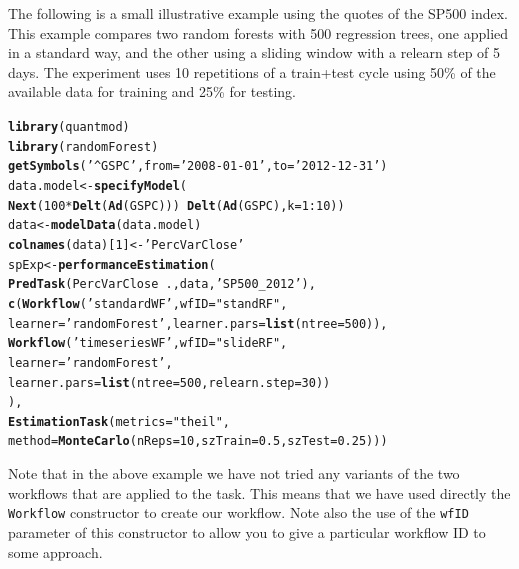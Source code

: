 \documentclass[10pt,a4paper]{article}\usepackage[]{graphicx}\usepackage[]{color}
\makeatletter
\newcommand{\hlnum}[1]{\textcolor[rgb]{0.686,0.059,0.569}{#1}}%
\newcommand{\hlstr}[1]{\textcolor[rgb]{0.192,0.494,0.8}{#1}}%
\newcommand{\hlopt}[1]{\textcolor[rgb]{0,0,0}{#1}}%
\newcommand{\hlstd}[1]{\textcolor[rgb]{0.345,0.345,0.345}{#1}}%
\newcommand{\hlkwb}[1]{\textcolor[rgb]{0.69,0.353,0.396}{#1}}%
\newcommand{\hlkwc}[1]{\textcolor[rgb]{0.333,0.667,0.333}{#1}}%
\newcommand{\hlkwd}[1]{\textcolor[rgb]{0.737,0.353,0.396}{\textbf{#1}}}%
\newenvironment{kframe}{%
 \def\at@end@of@kframe{}%
 \ifinner\ifhmode%
  \def\at@end@of@kframe{\end{minipage}}%
  \begin{minipage}{\columnwidth}%
 \fi\fi%
 \def\FrameCommand##1{\hskip\@totalleftmargin \hskip-\fboxsep
 \colorbox{shadecolor}{##1}\hskip-\fboxsep
     \hskip-\linewidth \hskip-\@totalleftmargin \hskip\columnwidth}%
 \MakeFramed {\advance\hsize-\width
   \@totalleftmargin\z@ \linewidth\hsize
   \@setminipage}}%
 {\par\unskip\endMakeFramed%
 \at@end@of@kframe}
\newenvironment{knitrout}{}{} %
\makeatother
\begin{document}
The following is a small illustrative example using the quotes of the
SP500 index. This example compares two random forests with 500
regression trees, one applied in a standard way, and the other using
a sliding window with a relearn step of 5 days. The experiment
uses 10 repetitions of a train+test cycle using 50\% of the available
data for training and 25\% for testing.

\begin{knitrout}\small
{}\color{fgcolor}\begin{kframe}
\begin{alltt}
\hlkwd{library}\hlstd{(quantmod)}
\hlkwd{library}\hlstd{(randomForest)}
\hlkwd{getSymbols}\hlstd{(}\hlstr{'^GSPC'}\hlstd{,}\hlkwc{from}\hlstd{=}\hlstr{'2008-01-01'}\hlstd{,}\hlkwc{to}\hlstd{=}\hlstr{'2012-12-31'}\hlstd{)}
\hlstd{data.model} \hlkwb{<-} \hlkwd{specifyModel}\hlstd{(}
  \hlkwd{Next}\hlstd{(}\hlnum{100}\hlopt{*}\hlkwd{Delt}\hlstd{(}\hlkwd{Ad}\hlstd{(GSPC)))} \hlopt{~} \hlkwd{Delt}\hlstd{(}\hlkwd{Ad}\hlstd{(GSPC),}\hlkwc{k}\hlstd{=}\hlnum{1}\hlopt{:}\hlnum{10}\hlstd{))}
\hlstd{data} \hlkwb{<-} \hlkwd{modelData}\hlstd{(data.model)}
\hlkwd{colnames}\hlstd{(data)[}\hlnum{1}\hlstd{]} \hlkwb{<-} \hlstr{'PercVarClose'}
\hlstd{spExp} \hlkwb{<-} \hlkwd{performanceEstimation}\hlstd{(}
  \hlkwd{PredTask}\hlstd{(PercVarClose} \hlopt{~} \hlstd{.,data,}\hlstr{'SP500_2012'}\hlstd{),}
  \hlkwd{c}\hlstd{(}\hlkwd{Workflow}\hlstd{(}\hlstr{'standardWF'}\hlstd{,}\hlkwc{wfID}\hlstd{=}\hlstr{"standRF"}\hlstd{,}
             \hlkwc{learner}\hlstd{=}\hlstr{'randomForest'}\hlstd{,}\hlkwc{learner.pars}\hlstd{=}\hlkwd{list}\hlstd{(}\hlkwc{ntree}\hlstd{=}\hlnum{500}\hlstd{)),}
    \hlkwd{Workflow}\hlstd{(}\hlstr{'timeseriesWF'}\hlstd{,}\hlkwc{wfID}\hlstd{=}\hlstr{"slideRF"}\hlstd{,}
             \hlkwc{learner}\hlstd{=}\hlstr{'randomForest'}\hlstd{,}
             \hlkwc{learner.pars}\hlstd{=}\hlkwd{list}\hlstd{(}\hlkwc{ntree}\hlstd{=}\hlnum{500}\hlstd{,}\hlkwc{relearn.step}\hlstd{=}\hlnum{30}\hlstd{))}
   \hlstd{),}
  \hlkwd{EstimationTask}\hlstd{(}\hlkwc{metrics}\hlstd{=}\hlstr{"theil"}\hlstd{,}
                 \hlkwc{method}\hlstd{=}\hlkwd{MonteCarlo}\hlstd{(}\hlkwc{nReps}\hlstd{=}\hlnum{10}\hlstd{,}\hlkwc{szTrain}\hlstd{=}\hlnum{0.5}\hlstd{,}\hlkwc{szTest}\hlstd{=}\hlnum{0.25}\hlstd{)))}
\end{alltt}
\end{kframe}
\end{knitrout}

Note that in the above example we have not tried any variants of the two workflows that are applied to the task. This means that we have used directly the \texttt{Workflow} constructor to create our workflow. Note also the use of the \texttt{wfID} parameter of this constructor to allow you to give a particular workflow ID to some approach.
\end{document}
